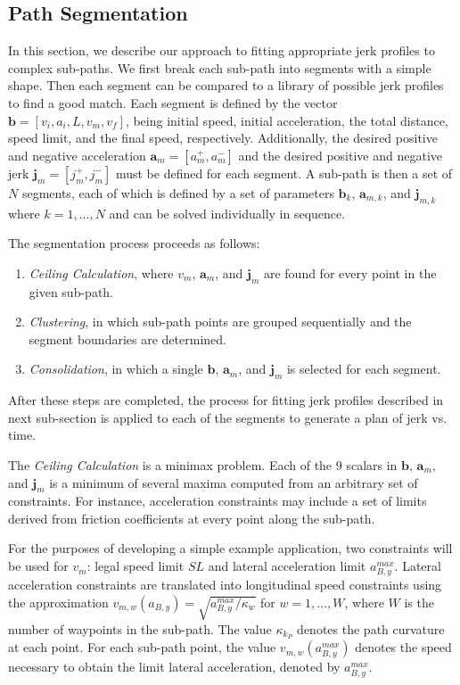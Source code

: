 \documentclass[letterpaper, 10 pt, conference]{ieeeconf}  %
\begin{document}
\subsection{Path Segmentation} \label{sec:pathsegmentation}

In this section, we describe our approach to fitting appropriate jerk profiles to complex sub-paths. 
We first break each sub-path into segments with a simple shape.
Then each segment can be compared to a library of possible jerk profiles to find a good match.
Each segment is defined by the vector $\mathbf{b}  = [v_i, a_i, L, v_m, v_f]$, being initial speed, initial acceleration, the total distance, speed limit, and the final speed, respectively.
Additionally, the desired positive and negative acceleration $\mathbf{a}_m = [a^+_m , a^-_m]$ and the desired positive and negative jerk $\mathbf{j}_m = [j^+_m , j^-_m]$ must be defined for each segment.
A sub-path is then a set of $N$ segments, each of which is defined by a set of parameters $\mathbf{b}_{k}$, $\mathbf{a}_{m,k}$, and $\mathbf{j}_{m,k}$ where $k = 1, ..., N$ and can be solved individually in sequence.


The segmentation process proceeds as follows:
\begin{enumerate} \label{asdf}
  \item \emph{Ceiling Calculation}, where $v_m$, $\mathbf{a}_m$, and $\mathbf{j}_m$ 
are found for every point in the given sub-path.
  \item \emph{Clustering}, in which sub-path points are grouped sequentially and the segment boundaries are determined.
  \item \emph{Consolidation}, in which a single $\mathbf{b}$, $\mathbf{a}_m$, and $\mathbf{j}_m$ is selected for each segment.
\end{enumerate}
After these steps are completed, the process for fitting jerk profiles described in next sub-section is applied to each of the segments to generate a plan of jerk vs. time.

The {\it Ceiling Calculation} is a minimax problem.
Each of the 9 scalars in $\mathbf{b}$, $\mathbf{a}_m$, and $\mathbf{j}_m$ is a minimum of several maxima computed from an arbitrary set of constraints.
For instance, acceleration constraints may include a set of limits derived from friction coefficients at every point along the sub-path.

For the purposes of developing a simple example application, two constraints will be used for $v_{m}$: legal speed limit $SL$ and lateral acceleration limit $a_{B,y}^{max}$. 
Lateral acceleration constraints are translated into longitudinal speed constraints using the approximation 
$v_{m,w}(a_{B,y}) = \sqrt{a_{B,y}^{max}/\kappa_{w}}$ for $w = 1, ..., W$, where $W$ is the number of waypoints in the sub-path.
The value $\kappa_{k_P}$ denotes the path curvature at each point.
For each sub-path point, the value $v_{m,w}(a_{B,y}^{max})$ denotes the speed necessary to obtain the limit lateral acceleration, denoted by $a^{max}_{B,y}$.
\end{document}
